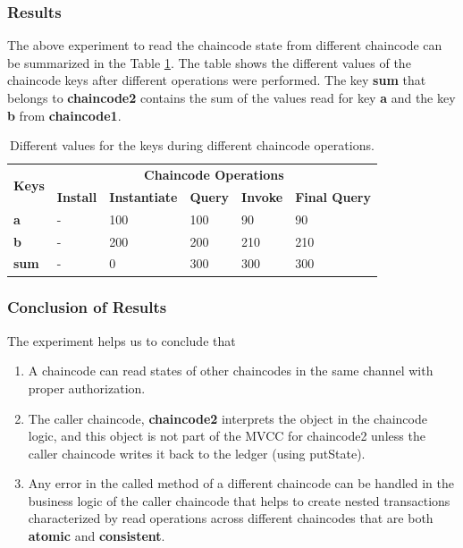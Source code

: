 \documentclass[
  a4paper,  %
  twoside,  %
  bibliography=totoc,
  headsepline,
  cleardoublepage=empty,
  parskip=half,
  draft=false
]{scrbook}
\begin{document}
\subsubsection{Results}
The above experiment to read the chaincode state from different chaincode can be summarized in the Table \ref{tab:result1}. The table shows the different values of the chaincode keys after different operations were performed. The key \textbf{sum} that belongs to \textbf{chaincode2} contains the sum of the values read for key \textbf{a} and the key \textbf{b} from \textbf{chaincode1}.
\begin{table}[h!]
\begin{center}
    \begin{tabular}{ |l|l|l|l|l|l|}
    \hline
    \multirow{2}{*}{\textbf{Keys}} & \multicolumn{5}{c|}{\textbf{Chaincode Operations}}\\ \cline{2-6}
    &\textbf{Install}& \textbf{Instantiate}& \textbf{Query}& \textbf{Invoke}& \textbf{Final Query} \\ \hline
    \textbf{a} & - & 100 & 100 & 90 & 90 \\ \hline
    \textbf{b} & - & 200 & 200 & 210 & 210 \\ \hline
    \textbf{sum} & - & 0 & 300 & 300 & 300 \\ \hline
    \end{tabular}
\end{center}
\caption{Different values for the keys during different chaincode operations.}
    \label{tab:result1}
\end{table}
\subsubsection{Conclusion of Results}
The experiment helps us to conclude that \begin{enumerate}
    \item A chaincode can read states of other chaincodes in the same channel with proper authorization.
    \item The caller chaincode, \textbf{chaincode2} interprets the object in the chaincode logic, and this object is not part of the MVCC for chaincode2 unless the caller chaincode writes it back to the ledger (using putState). 
    \item Any error in the called method of a different chaincode can be handled in the business logic of the caller chaincode that helps to create nested transactions characterized by read operations across different chaincodes that are both \textbf{atomic} and \textbf{consistent}.
\end{enumerate} 
\end{document}

